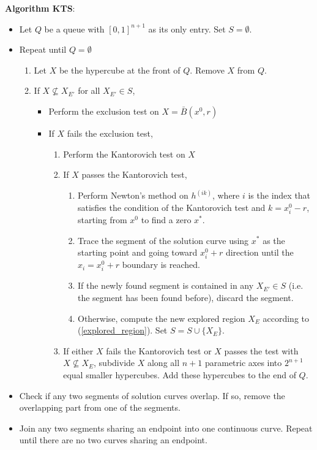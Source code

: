 \documentclass{article}
\begin{document}
\begin{flushleft}
\textbf{Algorithm KTS}:
\end{flushleft}
\begin{itemize}
\item Let $Q$ be a queue with $[0,1]^{n+1}$ as its only entry. Set $S
= \emptyset$. \item Repeat until $Q = \emptyset$
\begin{enumerate}
\item Let $X$ be the hypercube at the front of $Q$.  Remove $X$
from $Q$. \item If $X \not\subseteq X_{E'}$ for all $X_{E'} \in
S$,
\begin{itemize}
\item Perform the exclusion test on $X=\bar{B}(x^0,r)$
\item If $X$ fails the exclusion test,
\begin{enumerate}
\item Perform the Kantorovich test on $X$
\item If $X$ passes the Kantorovich test,
\begin{enumerate}
\item Perform Newton's method on $h^{(ik)}$, where $i$ is the
index that satisfies the condition of the Kantorovich test and $k
= x_i^0-r$, starting from $x^0$ to find a zero $x^*$.

\item Trace the segment of the solution curve using $x^*$ as
the starting point and going toward $x_i^0+r$ direction until the
$x_i = x_i^0+r$ boundary is reached.

\item If the newly found segment is contained in any $X_{E'} \in
S$ (i.e. the segment has been found before), discard the segment.

\item Otherwise, compute the new explored region $X_E$ according
to (\ref{explored_region}).  Set $S = S \cup \{X_E\}$.
\end{enumerate}
\item If either $X$ fails the Kantorovich test or $X$ passes the
test with $X \not\subseteq X_E$, subdivide $X$ along all $n+1$
parametric axes into $2^{n+1}$ equal smaller hypercubes. Add these hypercubes to
the end of $Q$.
\end{enumerate}
\end{itemize}
\end{enumerate}
\item Check if any two segments of solution curves overlap. If
so, remove the overlapping part from one of the segments.

\item Join any two segments sharing an endpoint into one
continuous curve. Repeat until there are no two curves sharing an
endpoint.
\end{itemize}
\end{document}
